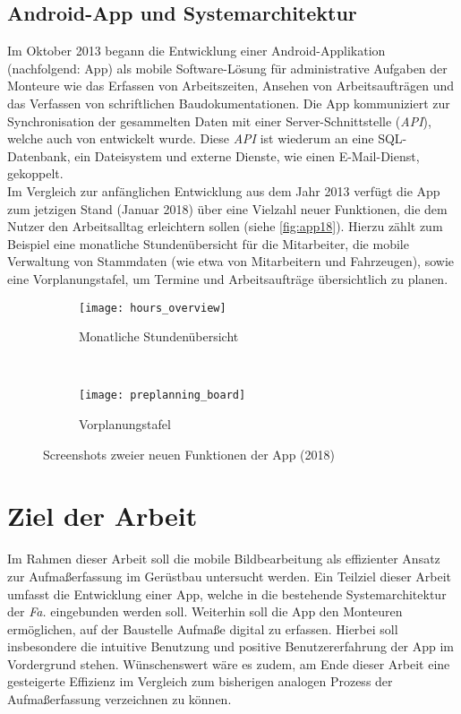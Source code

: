 \subsection{Android-App und Systemarchitektur}
Im Oktober 2013 begann die Entwicklung einer Android-Applikation (nachfolgend: App) als mobile Software-Lösung für administrative Aufgaben der Monteure wie das Erfassen von Arbeitszeiten, Ansehen von Arbeitsaufträgen und das Verfassen von schriftlichen Baudokumentationen.
Die App kommuniziert zur Synchronisation der gesammelten Daten mit einer Server-Schnittstelle (\emph{API}), welche auch von \vr{} entwickelt wurde.
Diese \emph{API} ist wiederum an eine SQL-Datenbank, ein Dateisystem und externe Dienste, wie einen E-Mail-Dienst, gekoppelt. \\

Im Vergleich zur anfänglichen Entwicklung aus dem Jahr 2013 verfügt die App zum jetzigen Stand (Januar 2018) über eine Vielzahl neuer Funktionen, die dem Nutzer den Arbeitsalltag erleichtern sollen (siehe \autoref{fig:app18}).
Hierzu zählt zum Beispiel eine monatliche Stundenübersicht für die Mitarbeiter, die mobile Verwaltung von Stammdaten (wie etwa von Mitarbeitern und Fahrzeugen), sowie eine Vorplanungstafel, um Termine und Arbeitsaufträge übersichtlich zu planen. 
\begin{figure}[h]
  \begin{subfigure}[t]{0.4\textwidth}
    \centering
    \texttt{[image: hours\_overview]}
    \caption{Monatliche Stundenübersicht}
  \end{subfigure}
  ~
  \begin{subfigure}[t]{0.4\textwidth}
    \centering
    \texttt{[image: preplanning\_board]}
    \caption{Vorplanungstafel}
  \end{subfigure}
  \centering
  \caption{Screenshots zweier neuen Funktionen der App (2018)}
  \label{fig:app18}
\end{figure}

\section{Ziel der Arbeit}
Im Rahmen dieser Arbeit soll die mobile Bildbearbeitung als effizienter Ansatz zur Aufmaßerfassung im Gerüstbau untersucht werden.
Ein Teilziel dieser Arbeit umfasst die Entwicklung einer App, welche in die bestehende Systemarchitektur der \emph{Fa.} \vr{} eingebunden werden soll.
Weiterhin soll die App den Monteuren ermöglichen, auf der Baustelle Aufmaße digital zu erfassen.
Hierbei soll insbesondere die intuitive Benutzung und positive Benutzererfahrung der App im Vordergrund stehen.
Wünschenswert wäre es zudem, am Ende dieser Arbeit eine gesteigerte Effizienz im Vergleich zum bisherigen analogen Prozess der Aufmaßerfassung verzeichnen zu können.


